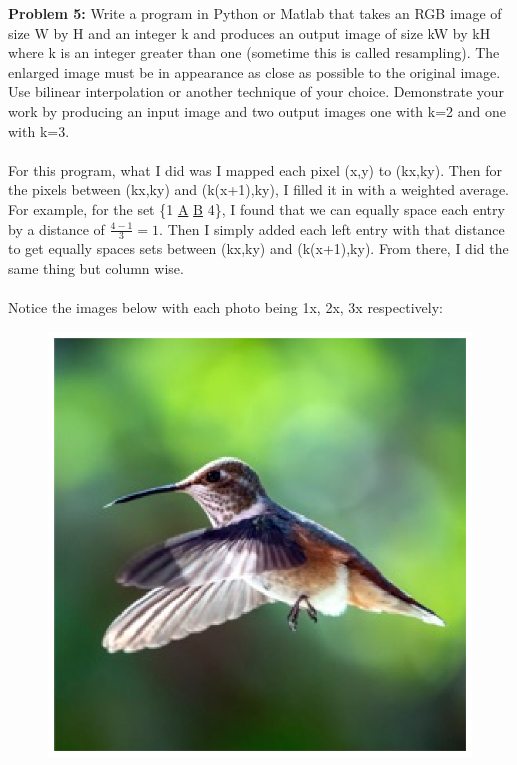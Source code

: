 \documentclass[11pt]{article}
\newenvironment{problem}[1]{\textbf{Problem #1: }}{\newpage}
\begin{document}
	\begin{problem}{5}
		Write a program in Python or Matlab that takes an RGB image of size W by H and an integer k and produces an output image of size kW by kH where k is an integer greater than one (sometime this is called resampling). The enlarged image must be in appearance as close as possible to the original image. Use bilinear interpolation or another technique of your choice.  Demonstrate your work by producing an input image and two output images one with k=2 and one with k=3.
		\\ \\
		For this program, what I did was I mapped each pixel (x,y) to (kx,ky).  Then for the pixels between (kx,ky) and (k(x+1),ky), I filled it in with a weighted average.  For example, for the set \{1 \underline{A} \underline{B} 4\}, I found that we can equally space each entry by a distance of $\frac{4-1}{3} = 1$.  Then I simply added each left entry with that distance to get equally spaces sets between (kx,ky) and (k(x+1),ky). From there, I did the same thing but column wise. 
		\\ \\
		Notice the images below with each photo being 1x, 2x, 3x respectively:
		\begin{figure}[h!]
			\centering
			\includegraphics{Matlab/Bird1}
		\end{figure}

\end{problem}
\end{document}
